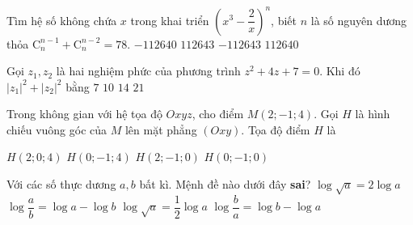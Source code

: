 \begin{ex}%
	Tìm hệ số không chứa $x$ trong khai triển $(x^3-\dfrac{2}{x})^n$, biết $n$ là số nguyên dương thỏa $\mathrm{C}^{n-1}_n+\mathrm{C}^{n-2}_n=78$.
	\choice
	{\True$-112640$}
	{ $112643$}
	{$-112643$}
	{$112640$}
\end{ex}

\begin{ex}%
	Gọi $z_1,z_2$ là hai nghiệm phức của phương trình $z^2+4z+7=0$. Khi đó $|z_1|^2+|z_2|^2$ bằng
	\choice
	{$7$}
	{ $10$}
	{\True$14$}
	{$21$}
\end{ex}

\begin{ex}%
	Trong không gian với hệ tọa độ $Oxyz$, cho điểm $M(2;-1;4)$. Gọi $H$ là hình chiếu vuông góc của $M$ lên mặt phẳng $(Oxy)$. Tọa độ điểm $H$ là
	
	\choice
	{$H(2;0;4)$}
	{$H(0;-1;4)$}
	{\True $H(2;-1;0)$}
	{$H(0;-1;0)$}
\end{ex}

\begin{ex}%
	Với các số thực dương $a,b$ bất kì. Mệnh đề nào dưới đây \textbf{sai}?
	\choice
	{\True $\log\sqrt{a}=2\log a$}
	{$\log\dfrac{a}{b}=\log a-\log b$}
	{$\log\sqrt{a}=\dfrac{1}{2}\log a$}
	{$\log\dfrac{b}{a}=\log b-\log a$}
\end{ex}

